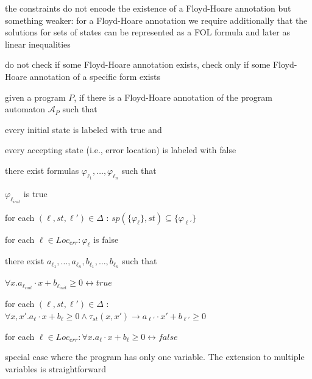 \documentclass[a4paper]{article}
\begin{document}
\begin{minipage}[t]{0.16\linewidth}
\begin{betterlist}
{{\begin{betterlist}
					\begin{betterlist}
						\item the constraints do not encode the existence of a Floyd-Hoare annotation but something weaker: for a Floyd-Hoare annotation we require additionally that the solutions for sets of states can be represented as a FOL formula and later as linear inequalities
						\item do not check if some Floyd-Hoare annotation exists, check only if some Floyd-Hoare annotation of a specific form exists
						\item given a program $P$, if there is a Floyd-Hoare annotation of the program automaton $\mathcal{A}_P$ such that
						\begin{betterlist}
							\item every initial state is labeled with true and
							\item every accepting state (i.e., error location) is labeled with false
						\end{betterlist}
						\item there exist formulas $\varphi_{\ell_1},\ldots , \varphi_{\ell_n}$ such that
						\begin{betterlist}
							\item $\varphi_{\ell_{init}}$ is true
							\item for each $(\ell , st, \ell ' ) \in \Delta$ : $sp(\{ \varphi_{\ell} \} , st) \subseteq \{ \varphi_{\ell'}\}$
							\item for each $\ell \in Loc_{err} : \varphi_{\ell}$ is false
						\end{betterlist}
						\item there exist $a_{\ell_1},\ldots, a_{\ell_n}, b_{\ell_1},\ldots, b_{\ell_n}$ such that
						\begin{betterlist}
							\item $\forall x. a_{\ell_{init}} \cdot  x + b_{\ell_{init}} \geq 0 \leftrightarrow true$
							\item for each $(\ell, st, \ell') \in \Delta$ : $\forall x, x' . a_{\ell} \cdot  x + b_{\ell} \geq 0 \land \tau_{st}(x, x') \rightarrow a_{\ell'} \cdot x' + b_{\ell'} \geq 0$
							\item for each $\ell \in Loc_{err} : \forall x. a_{\ell} \cdot  x + b_{\ell} \geq 0 \leftrightarrow false$
							\item special case where the program has only one variable. The extension to multiple variables is straightforward
						\end{betterlist}

\end{betterlist}
\end{betterlist}}}
\end{betterlist}
\end{minipage}
\end{document}
